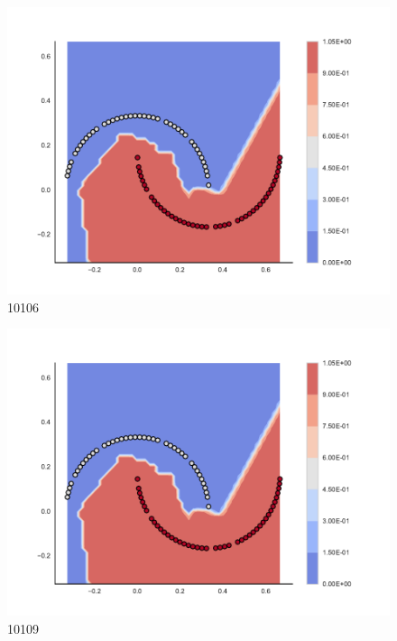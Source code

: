 \begin{subfigure}[b]{0.09\textwidth}
    \includegraphics[clip, trim=2.35cm 1.75cm 4.5cm 0cm,width=\textwidth]{img/convergence/10106.pdf}
    \caption{10106}
    \label{fig:convergence_10106}
\end{subfigure}
%
\begin{subfigure}[b]{0.09\textwidth}
    \includegraphics[clip, trim=2.35cm 1.75cm 4.5cm 0cm,width=\textwidth]{img/convergence/10109.pdf}
    \caption{10109}
    \label{fig:convergence_10109}
\end{subfigure}
%
